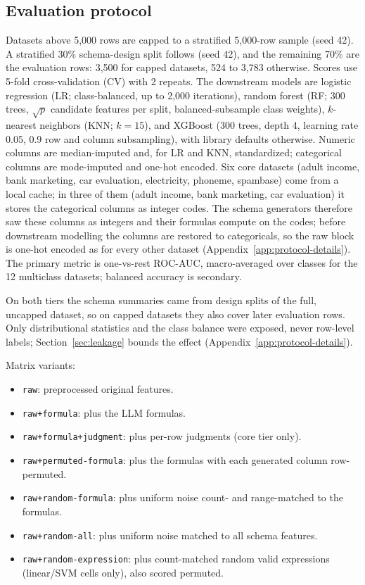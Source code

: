\subsection{Evaluation protocol}\label{sec:protocol}

Datasets above 5,000 rows are capped to a stratified 5,000-row sample (seed 42). A stratified 30\% schema-design split follows (seed 42), and the remaining 70\% are the evaluation rows: 3,500 for capped datasets, 524 to 3,783 otherwise. Scores use 5-fold cross-validation (CV) with 2 repeats. The downstream models are logistic regression (LR; class-balanced, up to 2,000 iterations), random forest (RF; 300 trees, \(\sqrt{p}\) candidate features per split, balanced-subsample class weights), \(k\)-nearest neighbors (KNN; \(k = 15\)), and XGBoost \citep{chen2016xgboost} (300 trees, depth 4, learning rate 0.05, 0.9 row and column subsampling), with library defaults otherwise. Numeric columns are median-imputed and, for LR and KNN, standardized; categorical columns are mode-imputed and one-hot encoded. Six core datasets (adult income, bank marketing, car evaluation, electricity, phoneme, spambase) come from a local cache; in three of them (adult income, bank marketing, car evaluation) it stores the categorical columns as integer codes. The schema generators therefore saw these columns as integers and their formulas compute on the codes; before downstream modelling the columns are restored to categoricals, so the raw block is one-hot encoded as for every other dataset (Appendix~\ref{app:protocol-details}). The primary metric is one-vs-rest ROC-AUC, macro-averaged over classes for the 12 multiclass datasets; balanced accuracy is secondary.

On both tiers the schema summaries came from design splits of the full, uncapped dataset, so on capped datasets they also cover later evaluation rows. Only distributional statistics and the class balance were exposed, never row-level labels; Section~\ref{sec:leakage} bounds the effect (Appendix~\ref{app:protocol-details}).

Matrix variants:

\begin{itemize}
\item
  \texttt{raw}: preprocessed original features.
\item
  \texttt{raw+formula}: plus the LLM formulas.
\item
  \texttt{raw+formula+judgment}: plus per-row judgments (core tier only).
\item
  \texttt{raw+permuted-formula}: plus the formulas with each generated column row-permuted.
\item
  \texttt{raw+random-formula}: plus uniform noise count- and range-matched to the formulas.
\item
  \texttt{raw+random-all}: plus uniform noise matched to all schema features.
\item
  \texttt{raw+random-expression}: plus count-matched random valid expressions (linear/SVM cells only), also scored permuted.
\end{itemize}

